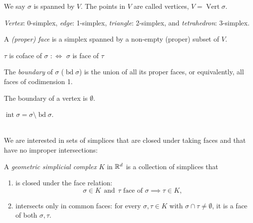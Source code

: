 \begin{multicols*}{3}
\begin{defi}
\end{defi}
\rspace
\begin{defi}[Vertex]
We say $\sigma$ is spanned by $V$. The points in $V$ are called vertices, $V=\operatorname{Vert} \sigma$.
\end{defi}
\rspace
\begin{rem}
\emph{Vertex}: 0-simplex, \emph{edge}: 1-simplex, \emph{triangle}: 2-simplex, and \emph{tetrahedron}: 3-simplex.
\end{rem}
\rspace
\begin{defi}[Face]
A \emph{(proper) face} is a simplex spanned by a non-empty (proper) subset of $V$.
\end{defi}
\rspace
\begin{defi}[Coface]
$\tau$ is coface of $\sigma$ $:\iff$ $\sigma$ is face of $\tau$
\end{defi}
\rspace
\begin{defi}[Boundary]
The \emph{boundary} of $\sigma$ ($\operatorname{bd} \sigma$) is the union of all its proper faces, or equivalently, all faces of codimension 1.
\end{defi}
\rspace
\begin{rem}
The boundary of a vertex is $\emptyset$.
\end{rem}
\rspace
\begin{defi}[Interior]
$\operatorname{int} \sigma = \sigma \setminus \operatorname{bd} \sigma$.
\end{defi}
\vspace{-1pc}
\drawaline\\ 
{\myfont We are interested in sets of simplices that are closed under taking faces and that have no improper intersections:}\vspace{-0.6pc}
\begin{definition} A \emph{geometric simplicial complex} $K$ in $\mathbb{R}^d$ is a collection of simplices that 
\begin{enumerate}[itemsep = -7pt]
\item is closed under the face relation: \vspace{-0.3pc}
$$ \sigma \in K \ \ \text{and}\ \  \tau \text{ face of } \sigma \implies \tau \in K,$$
\item intersects only in common faces: for every $\sigma, \tau \in K$ with $\sigma \cap \tau \neq \emptyset$, it is a face of both $\sigma, \tau$.
\end{enumerate}
\end{definition}
\rspace
\begin{definition}[Dimension]

\end{definition}
\end{multicols*}
